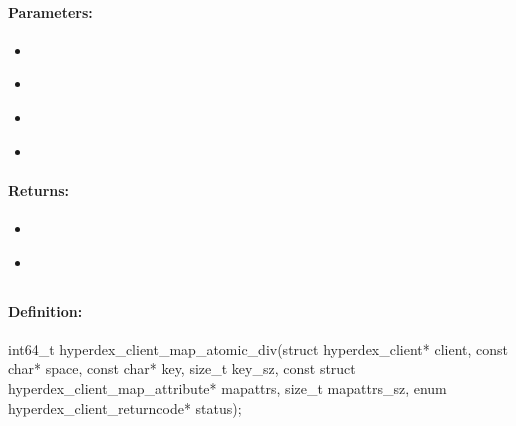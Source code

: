 \paragraph{Parameters:}
\begin{itemize}[noitemsep]
\item {}\\

\item {}\\

\item {}\\

\item {}\\

\end{itemize}

\paragraph{Returns:}
\begin{itemize}[noitemsep]
\item {}\\

\item {}\\

\end{itemize}

\pagebreak
\subsection{}
\label{api:c:map_atomic_div}


\paragraph{Definition:}
\begin{ccode}
int64_t hyperdex_client_map_atomic_div(struct hyperdex_client* client,
        const char* space,
        const char* key, size_t key_sz,
        const struct hyperdex_client_map_attribute* mapattrs, size_t mapattrs_sz,
        enum hyperdex_client_returncode* status);
\end{ccode}

